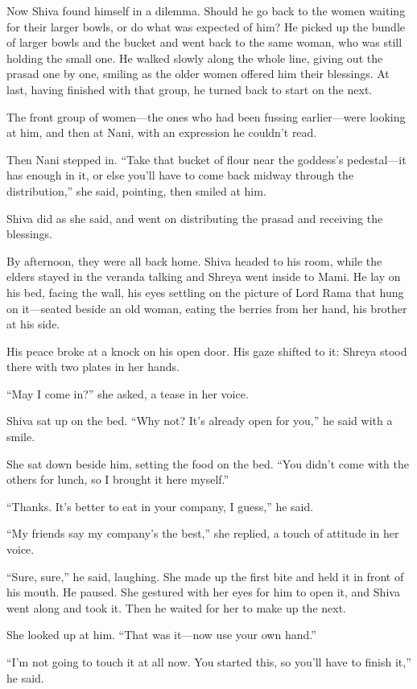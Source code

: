 Now Shiva found himself in a dilemma. Should he go back to the women waiting for their larger bowls, or do what was expected of him? He picked up the bundle of larger bowls and the bucket and went back to the same woman, who was still holding the small one. He walked slowly along the whole line, giving out the prasad one by one, smiling as the older women offered him their blessings. At last, having finished with that group, he turned back to start on the next.

The front group of women—the ones who had been fussing earlier—were looking at him, and then at Nani, with an expression he couldn't read.

Then Nani stepped in. ``Take that bucket of flour near the goddess's pedestal—it has enough in it, or else you'll have to come back midway through the distribution,'' she said, pointing, then smiled at him.

Shiva did as she said, and went on distributing the prasad and receiving the blessings.

By afternoon, they were all back home. Shiva headed to his room, while the elders stayed in the veranda talking and Shreya went inside to Mami. He lay on his bed, facing the wall, his eyes settling on the picture of Lord Rama that hung on it—seated beside an old woman, eating the berries from her hand, his brother at his side.

His peace broke at a knock on his open door. His gaze shifted to it: Shreya stood there with two plates in her hands.

``May I come in?'' she asked, a tease in her voice.

Shiva sat up on the bed. ``Why not? It's already open for you,'' he said with a smile.

She sat down beside him, setting the food on the bed. ``You didn't come with the others for lunch, so I brought it here myself.''

``Thanks. It's better to eat in your company, I guess,'' he said.

``My friends say my company's the best,'' she replied, a touch of attitude in her voice.

``Sure, sure,'' he said, laughing.
She made up the first bite and held it in front of his mouth. He paused. She gestured with her eyes for him to open it, and Shiva went along and took it. Then he waited for her to make up the next.

She looked up at him. ``That was it—now use your own hand.''

``I'm not going to touch it at all now. You started this, so you'll have to finish it,'' he said.